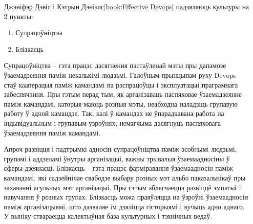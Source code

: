 Джэніфэр Дэвіс і Кэтрын Дэніэлс\ref{book:Effective Devops}
падзяляюць культуры на 2 пункты:
\begin{enumerate}
    \item Супрацоўніцтва
    \item Блізкасць
\end{enumerate}
Супрацоўніцтва -- гэта працэс дасягнення пастаўленай мэты
пры дапамозе ўзаемадзеяння паміж некалькімі людзьмі.
Галоўным прынцыпам руху Devops стаў кааперацыя паміж
камандамі па распрацоўцы і эксплуатацыі праграмнага забеспячэння.
Пры гэтым перад тым, як арганізаваць паспяховае
ўзаемадзеянне паміж камандамі, каторыя маюць розныя мэты,
неабходна наладзіць групавую работу ў адной камандзе.
Так, калі ў камандах не ўпарадкавана работа на індывідуальным
і групавым узроўнях, немагчыма дасягнуць паспяховага ўзаемадзеяння
паміж камандамі.

Апроч развіцця і падтрымкі адносін супрацоўніцтва паміж
асобнымі людзьмі, групамі і аддзеламі ўнутры арганізацыі,
важны трывалыя ўзаемаадносіны ў сферы дзеянасці.
Блізкасць -- гэта працэс фарміравання ўзаемаадносін паміж
камандамі, які садзейнічае свабодзе выбару розных мэт альбо
паказальнікаў пры захаванні агульных мэт арганізацыі.
Пры гэтым аблягчаецца развіццё эмпатыі і навучання ў розных групах.
Блізкасць можа праяўляцца на ўзроўні ўзаемаадносін паміж
арганізацыямі, што дазваляе ім дзяліцца гісторыямі і вучыць адно
аднаго. У выніку ствараецца калектыўная база культурных і тэхнічных ведаў.

%

